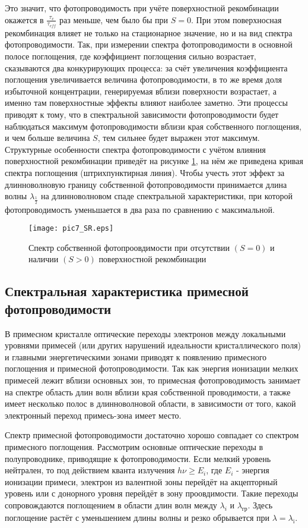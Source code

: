 Это значит, что фотопроводимость при учёте поверхностной рекомбинации окажется в $\frac{\tau_{v}}{\tau_{eff}}$ раз меньше, чем было бы при $S = 0$. При этом поверхносная рекомбинация влияет не только на стационарное значение, но и на вид спектра фотопроводимости. Так, при измерении спектра фотопроводимости в основной полосе поглощения, где коэффициент поглощения сильно возрастает, сказываются два конкурирующих процесса: за счёт увеличения коэффициента поглощения увеличивается величина фотопроводимости, в то же время доля избыточной концентрации, генерируемая вблизи поверхности возрастает, а именно там поверхностные эффекты влияют наиболее заметно. Эти процессы приводят к тому, что в спектральной зависимости фотопроводимости будет наблюдаться максимум фотопроводимости вблизи края собственного поглощения, и чем больше величина $S$, тем сильнее будет выражен этот максимум. Структурные особенности спектра фотопроводимости с учётом влияния поверхностной рекомбинации приведёт на рисунке \ref{pic7_SR}, на нём же приведена кривая спектра поглощения (штрихпунктирная линия). Чтобы учесть этот эффект за длинноволновую границу собственной фотопроводимости принимается длина волны $\lambda_{\frac{1}{2}}$ на длинноволновом спаде спектральной характеристики, при которой фотопроводимость уменьшается в два раза по сравнению с максимальной.

\begin{figure}[h!]\centering
\texttt{[image: pic7\_SR.eps]}
\caption{Спектр собственной фотопроовдимости при отсутствии $(S = 0)$ и наличии $(S > 0)$ поверхностной рекомбинации}
\label{pic7_SR}
\end{figure}

\subsection{Спектральная характеристика примесной фотопроводимости}
В примесном кристалле оптические переходы электронов между локальными уровнями примесей (или других нарушений идеальности кристаллического поля) и главными энергетическими зонами приводят к появлению примесного поглощения и примесной фотопроводимости. Так как энергия ионизации мелких примесей лежит вблизи основных зон, то примесная фотопроводимость занимает на спектре область длин волн вблизи края собственной проводимости, а также имеет несколько полос в длинноволновой области, в зависимости от того, какой электронный переход примесь-зона имеет место.

Спектр примесной фотопроводимости достаточно хорошо совпадает со спектром примесного поглощения. Рассмотрим основные оптические переходы в полупроводнике, приводящие к фотопроводимости. Если мелкий уровень нейтрален, то под действием кванта излучения $h \nu \ge E_{i}$, где $E_{i}$  - энергия ионизации примеси, электрон из валентной зоны перейдёт на акцепторный уровень или с донорного уровня перейдёт в зону проовдимости. Такие переходы сопровождаются поглощением в области длин волн между $\lambda_{i}$ и $\lambda_{\text{гр}}$. Здесь поглощение растёт с уменьшением длины волны и резко обрывается при $\lambda = \lambda_{\text{i}}$.

